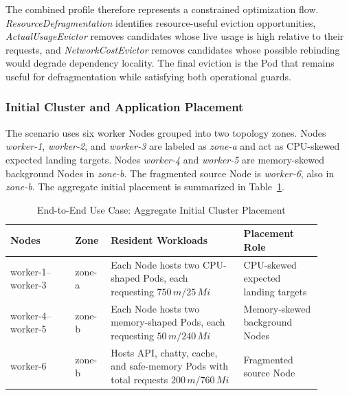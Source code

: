 The combined profile therefore represents a constrained optimization flow. \textit{ResourceDefragmentation} identifies resource-useful eviction opportunities, \textit{ActualUsageEvictor} removes candidates whose live usage is high relative to their requests, and \textit{NetworkCostEvictor} removes candidates whose possible rebinding would degrade dependency locality. The final eviction is the Pod that remains useful for defragmentation while satisfying both operational guards.

\subsubsection{Initial Cluster and Application Placement}

The scenario uses six worker Nodes grouped into two topology zones. Nodes \textit{worker-1}, \textit{worker-2}, and \textit{worker-3} are labeled as \textit{zone-a} and act as CPU-skewed expected landing targets. Nodes \textit{worker-4} and \textit{worker-5} are memory-skewed background Nodes in \textit{zone-b}. The fragmented source Node is \textit{worker-6}, also in \textit{zone-b}. The aggregate initial placement is summarized in Table~\ref{tab:e2e_cluster_layout}.

\begin{table}[tbp]
    \centering
    \caption{End-to-End Use Case: Aggregate Initial Cluster Placement}
    \label{tab:e2e_cluster_layout}
    \renewcommand{\arraystretch}{1.2}
    \scriptsize
    \setlength{\tabcolsep}{2pt}
    \begin{tabular}{@{}>{\raggedright\arraybackslash}p{0.19\linewidth}
                    >{\raggedright\arraybackslash}p{0.09\linewidth}
                    >{\raggedright\arraybackslash}p{0.39\linewidth}
                    >{\raggedright\arraybackslash}p{0.23\linewidth}@{}}
        \toprule
        \textbf{Nodes} & \textbf{Zone} & \textbf{Resident Workloads} & \textbf{Placement Role} \\
        \midrule
        worker-1--worker-3 & zone-a & Each Node hosts two CPU-shaped Pods, each requesting $750\,m/25\,Mi$ & CPU-skewed expected landing targets \\
        worker-4--worker-5 & zone-b & Each Node hosts two memory-shaped Pods, each requesting $50\,m/240\,Mi$ & Memory-skewed background Nodes \\
        worker-6 & zone-b & Hosts API, chatty, cache, and safe-memory Pods with total requests $200\,m/760\,Mi$ & Fragmented source Node \\
        \bottomrule
    \end{tabular}
\end{table}

